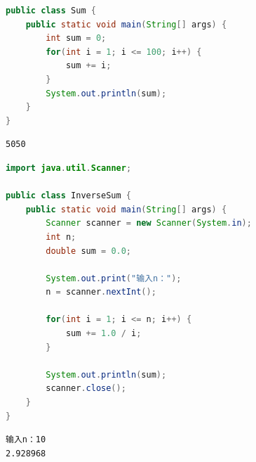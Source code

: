\vspace{0.5cm}


\begin{lstlisting}[language=Java]
public class Sum {
    public static void main(String[] args) {
        int sum = 0;
        for(int i = 1; i <= 100; i++) {
            sum += i;
        }
        System.out.println(sum);
    }
}
\end{lstlisting}

\begin{tcolorbox}
	\begin{verbatim}
5050
    \end{verbatim}
\end{tcolorbox}

\vspace{0.5cm}


\begin{lstlisting}[language=Java]
import java.util.Scanner;

public class InverseSum {
    public static void main(String[] args) {
        Scanner scanner = new Scanner(System.in);
        int n;
        double sum = 0.0;
        
        System.out.print("输入n：");
        n = scanner.nextInt();
        
        for(int i = 1; i <= n; i++) {
            sum += 1.0 / i;
        }
        
        System.out.println(sum);
        scanner.close();
    }
}
\end{lstlisting}

\begin{tcolorbox}
	\begin{verbatim}
输入n：10
2.928968
    \end{verbatim}
\end{tcolorbox}

\vspace{0.5cm}


